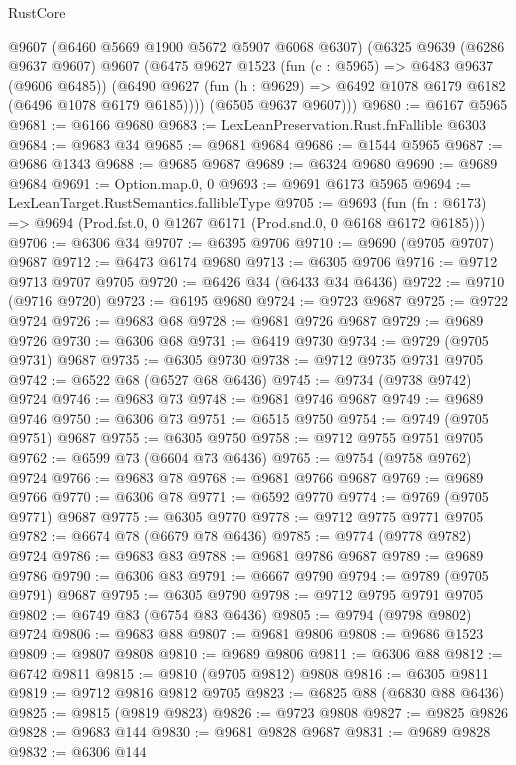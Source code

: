\begin{lexlean}{RustCore}
\begin{coremodule}
      @9607
      (@6460 @5669 @1900 @5672 @5907 @6068 @6307)
      (@6325
        @9639
        (@6286 @9637 @9607)
        @9607
        (@6475
          @9627
          @1523
          (fun (c : @5965) => @6483 @9637 (@9606 @6485))
          (@6490 @9627 (fun (h : @9629) => @6492 @1078 @6179 @6182 (@6496 @1078 @6179 @6185))))
        (@6505 @9637 @9607)))
@9680 := @6167 @5965
@9681 := @6166 @9680
@9683 := LexLeanPreservation.Rust.fnFallible @6303
@9684 := @9683 @34
@9685 := @9681 @9684
@9686 := @1544 @5965
@9687 := @9686 @1343
@9688 := @9685 @9687
@9689 := @6324 @9680
@9690 := @9689 @9684
@9691 := Option.map.{0, 0}
@9693 := @9691 @6173 @5965
@9694 := LexLeanTarget.RustSemantics.fallibleType
@9705 := @9693
    (fun (fn : @6173) => @9694 (Prod.fst.{0, 0} @1267 @6171 (Prod.snd.{0, 0} @6168 @6172 @6185)))
@9706 := @6306 @34
@9707 := @6395 @9706
@9710 := @9690 (@9705 @9707) @9687
@9712 := @6473 @6174 @9680
@9713 := @6305 @9706
@9716 := @9712 @9713 @9707 @9705
@9720 := @6426 @34 (@6433 @34 @6436)
@9722 := @9710 (@9716 @9720)
@9723 := @6195 @9680
@9724 := @9723 @9687
@9725 := @9722 @9724
@9726 := @9683 @68
@9728 := @9681 @9726 @9687
@9729 := @9689 @9726
@9730 := @6306 @68
@9731 := @6419 @9730
@9734 := @9729 (@9705 @9731) @9687
@9735 := @6305 @9730
@9738 := @9712 @9735 @9731 @9705
@9742 := @6522 @68 (@6527 @68 @6436)
@9745 := @9734 (@9738 @9742) @9724
@9746 := @9683 @73
@9748 := @9681 @9746 @9687
@9749 := @9689 @9746
@9750 := @6306 @73
@9751 := @6515 @9750
@9754 := @9749 (@9705 @9751) @9687
@9755 := @6305 @9750
@9758 := @9712 @9755 @9751 @9705
@9762 := @6599 @73 (@6604 @73 @6436)
@9765 := @9754 (@9758 @9762) @9724
@9766 := @9683 @78
@9768 := @9681 @9766 @9687
@9769 := @9689 @9766
@9770 := @6306 @78
@9771 := @6592 @9770
@9774 := @9769 (@9705 @9771) @9687
@9775 := @6305 @9770
@9778 := @9712 @9775 @9771 @9705
@9782 := @6674 @78 (@6679 @78 @6436)
@9785 := @9774 (@9778 @9782) @9724
@9786 := @9683 @83
@9788 := @9681 @9786 @9687
@9789 := @9689 @9786
@9790 := @6306 @83
@9791 := @6667 @9790
@9794 := @9789 (@9705 @9791) @9687
@9795 := @6305 @9790
@9798 := @9712 @9795 @9791 @9705
@9802 := @6749 @83 (@6754 @83 @6436)
@9805 := @9794 (@9798 @9802) @9724
@9806 := @9683 @88
@9807 := @9681 @9806
@9808 := @9686 @1523
@9809 := @9807 @9808
@9810 := @9689 @9806
@9811 := @6306 @88
@9812 := @6742 @9811
@9815 := @9810 (@9705 @9812) @9808
@9816 := @6305 @9811
@9819 := @9712 @9816 @9812 @9705
@9823 := @6825 @88 (@6830 @88 @6436)
@9825 := @9815 (@9819 @9823)
@9826 := @9723 @9808
@9827 := @9825 @9826
@9828 := @9683 @144
@9830 := @9681 @9828 @9687
@9831 := @9689 @9828
@9832 := @6306 @144

\end{coremodule}
\end{lexlean}
